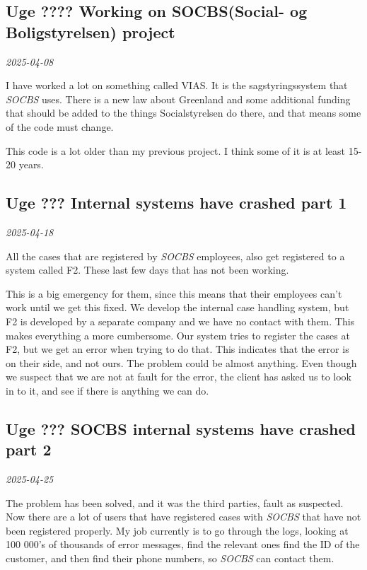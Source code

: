 \documentclass[../main.tex]{subfiles}
\begin{document}
\subsection{Uge ???? \textbf{Working on SOCBS(Social- og Boligstyrelsen) project}}

\textit{2025-04-08}

I have worked a lot on something called VIAS. It is the sagstyringssystem that \textit{SOCBS} uses. There is a new law about Greenland and some additional funding that should be added to the things Socialstyrelsen do there, and that means some of the code must change.

This code is a lot older than my previous project. I think some of it is at least 15-20 years. 

\subsection{Uge ??? \textbf{Internal systems have crashed part 1}}

\textit{2025-04-18}

All the cases that are registered by \textit{SOCBS} employees, also get registered to a system called F2. These last few days that has not been working. 

This is a big emergency for them, since this means that their employees can't work until we get this fixed.
We develop the internal case handling system, but F2 is developed by a separate company and we have no contact with them.
This makes everything a more cumbersome. Our system tries to register the cases at F2, but we get an error when trying to do that. 
This indicates that the error is on their side, and not ours. The problem could be almost anything.
Even though we suspect that we are not at fault for the error, the client has asked us to look in to it, and see if there is anything we can do.

\subsection{Uge ??? \textbf{SOCBS internal systems have crashed part 2}}

\textit{2025-04-25}

The problem has been solved, and it was the third parties, fault as suspected. Now there are a lot of users that have registered cases with \textit{SOCBS} that have not been registered properly. 
My job currently is to go through the logs, looking at 100 000's of thousands of error messages, find the relevant ones find the ID of the customer, and then find their phone numbers, so \textit{SOCBS} can contact them.
\end{document}
